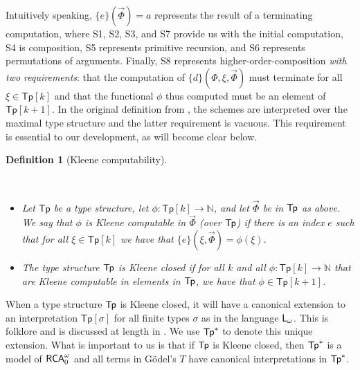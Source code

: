 \documentclass[reqno]{amsart}
\newtheorem{definition}[thm]{Definition}
\def\RCA{\textup{\textsf{RCA}}}
\def\N{{\mathbb  N}}
\def\L{\textsf{\textup{L}}}
\def\TP{\textup{\textsf{Tp}}}
\newcommand{\Tp}{\mathsf{Tp}}
\numberwithin{equation}{section}
\numberwithin{thm}{section}
\begin{document}
Intuitively speaking, $\{e\}(\vec \Phi) = a$ represents the result of a terminating computation, where S1, S2, S3, and S7 provide us with the initial computation, S4 is composition, S5 represents primitive recursion, and S6 represents permutations of arguments. Finally, S8 represents higher-order-composition \emph{with two requirements}: that the computation of $\{d\}(\Phi , \xi , \vec \Phi)$ must terminate for all $\xi \in \Tp[k]$ and that the functional $\phi$ thus computed must be an element of $\Tp[k+1]$. In the original definition from \cite{kleeneS1S9}, the schemes are interpreted over the maximal type structure and the latter requirement is vacuous.  This requirement is essential to our development, as will become clear below. 
\begin{definition}[Kleene computability]\label{uneek}
{\em  ~ \begin{itemize}\label{godalmach}
\item[(a)] Let $\Tp$ be a type structure, let $\phi:\Tp[k] \rightarrow \N$, and let $\vec \Phi$ be in $\TP$ as above.  We say that $\phi$ is \emph{Kleene computable} in $\vec \Phi$ (over $\TP$) if there is an index $e$ such that for all $\xi \in \Tp[k]$ we have that $\{e\}(\xi , \vec \Phi) = \phi(\xi)$.
\item[(b)] The type structure $\TP$ is \emph{Kleene closed} if for all $k$ and all $\phi:\Tp[k] \rightarrow \N$ that are Kleene computable in elements in $\TP$, we have that $\phi \in \Tp[k+1]$. 
\end{itemize}}
\end{definition}
When a type structure $\TP$ is Kleene closed, it will have a canonical extension to an interpretation $\Tp[\sigma]$ for all finite types $\sigma$ as in the language $\L_\omega$. This is folklore and is discussed at length in \cite[\S 4.2]{longmann}. 
We use $\TP^*$ to denote this unique extension. 
What is important to us is that if $\TP$ is Kleene closed, then $\TP^*$ is a model of $\RCA_0^\omega$ and all terms in G\"odel's $T$ have canonical interpretations in $\TP^*$.

\smallskip
\end{document}
